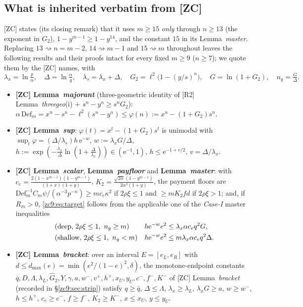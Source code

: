 \documentclass[11pt]{amsart}
\newcommand{\eu}{\mathrm{e}}
\newcommand{\Def}{\mathrm{Def}}
\begin{document}
\subsection*{What is inherited verbatim from [ZC]}
[ZC] states (its closing remark) that it uses $m\ge15$ \emph{only} through
$n\ge13$ (the exponent in $G_2$), $1-y^{m-1}\ge1-y^{14}$, and the constant $15$
in its Lemma~\emph{master}.  Replacing $13\rightsquigarrow n=m-2$,
$14\rightsquigarrow m-1$ and $15\rightsquigarrow m$ throughout leaves the
following results and their proofs intact for every fixed $m\ge9$ ($n\ge7$); we
quote them by the [ZC] names, with
\[
 \lambda_x=\ln\tfrac p\alpha,\quad \Delta=\ln\tfrac\alpha q,\quad
 \lambda_s=\lambda_x+\Delta,\quad G_2=\ell^2\bigl(1-(y/s)^{n}\bigr),\quad
 G=\ln(1+G_2),\quad n_g=\tfrac G\Delta .
\]
\begin{itemize}
\item \textbf{[ZC] Lemma~\emph{majorant}} (three-geometric identity of [R2]
 Lemma~\emph{threegeo}(i) + $s^n-y^n\ge s^nG_2$):
 $\alpha\,\Def_m=x^n-s^n-\ell^2(s^n-y^n)\le\varphi(n):=x^n-(1+G_2)s^n$.
\item \textbf{[ZC] Lemma~\emph{sup}}: $\varphi(t)=x^t-(1+G_2)s^t$ is unimodal with
 $\sup_t\varphi=(\Delta/\lambda_s)h\,\eu^{-w}$, $w:=\lambda_xG/\Delta$,
 $h:=\exp(-\tfrac{\lambda_x}\Delta\ln(1+\tfrac\Delta{\lambda_x}))\in(\eu^{-1},1)$,
 $h\le\eu^{-1+v/2}$, $v=\Delta/\lambda_x$.
\item \textbf{[ZC] Lemma~\emph{scalar}}, \textbf{Lemma~\emph{payfloor}} and
 \textbf{Lemma~\emph{master}}: with
 $c_e=\tfrac{2(1-x^{m-1})(1-y^{m-1})}{(1+x)(1+y)}$,
 $K_2=\tfrac{\sqrt{2\alpha}(1-y^{m-1})}{2\alpha^3(1+y)}$, the payment floors are
 $\Def_m^{-1}C_m\psi/(\alpha^{-3}p^{-n})\ge m c_e\kappa^2$ if $2\rho\xi\le1$ and
 $\ge mK_2fd$ if $2\rho\xi>1$; and, if $R_m>0$, \eqref{zc9:eq:target} follows
 from the applicable one of the \emph{Case-I} master inequalities
 \begin{align}
  &\textup{(deep,}\ 2\rho\xi\le1,\ n_g\ge m)&
   h\eu^{-w}e^2&\le\lambda_x\alpha c_e q^2G,\label{zc9:eq:SCdeep}\\
  &\textup{(shallow,}\ 2\rho\xi\le1,\ n_g<m)&
   h\eu^{-w}e^2&\le m\lambda_x\alpha c_e q^2\Delta.\label{zc9:eq:SCsh}
 \end{align}
\item \textbf{[ZC] Lemma~\emph{bracket}}: over an interval $E=[e_L,e_R]$ with
 $d\le d_{\max}(e)=\min(e^2/(1-e)^2,\delta)$, the monotone-endpoint constants
 $\bar q,D,\Lambda,\lambda_L,\widehat G_2,Y,\gamma,a,w^-,v^+,h^+,x_U,y_U,c^-,
 f^-,K^-$ of [ZC] Lemma~\emph{bracket} (recorded in \S\ref{zc9:sec:strip})
 satisfy $q\ge\bar q$, $\Delta\le\Lambda$, $\lambda_x\ge\lambda_L$,
 $\lambda_xG\ge a$, $w\ge w^-$, $h\le h^+$, $c_e\ge c^-$, $f\ge f^-$,
 $K_2\ge K^-$, $x\le x_U$, $y\le y_U$.
\end{itemize}
\end{document}
